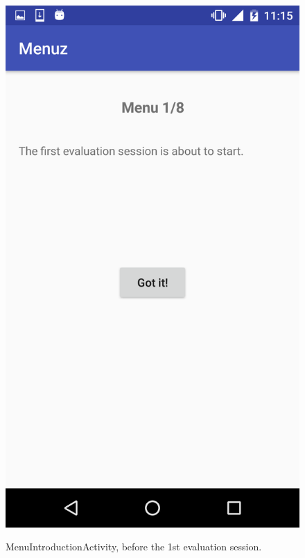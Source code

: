 \begin{figure}[!ht]
  \begin{center}
    \includegraphics[scale=0.22]{img/menuintro_activityb.png}
    \label{fig:menuintro_activityb}
    \caption{MenuIntroductionActivity, before the 1st evaluation session.}
  \end{center}
\end{figure}

\newpage

